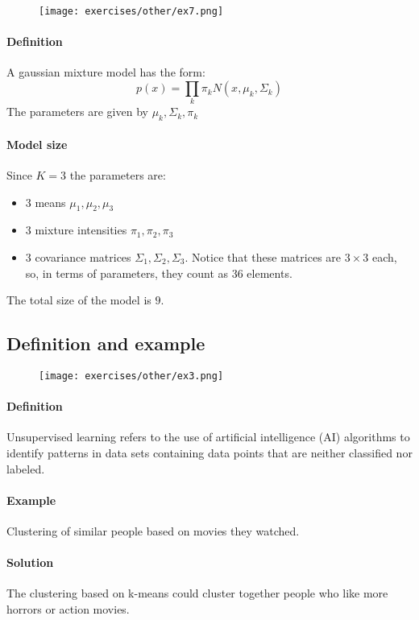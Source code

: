 \begin{figure}[H]
    \centering
    \texttt{[image: exercises/other/ex7.png]}
\end{figure}

\paragraph{Definition}
A gaussian mixture model has the form:
$$p(x)=\prod_k \pi_k N(x,\mu_k,\Sigma_k)$$
The parameters are given by $\mu_k, \Sigma_k, \pi_k$

\paragraph{Model size }
Since $K=3$ the parameters are: 
\begin{itemize}
\item 3 means $\mu_1,\mu_2,\mu_3$ 
\item 3 mixture intensities $\pi_1,\pi_2,\pi_3$ 
\item 3 covariance matrices $\Sigma_1,\Sigma_2,\Sigma_3$. Notice that these matrices are $3\times 3$ each, so, in terms of parameters, they count as $36$ elements.
\end{itemize}
The total size of the model is $9$.


\subsection{Definition and example}

\begin{figure}[H]
    \centering
    \texttt{[image: exercises/other/ex3.png]}
\end{figure}


\paragraph{Definition}
Unsupervised learning refers to the use of artificial intelligence (AI) algorithms to identify patterns in data sets containing data points that are neither classified nor labeled.

\paragraph{Example}
Clustering of similar people based on movies they watched.

\paragraph{Solution}
The clustering based on k-means could cluster together people who like more horrors or action movies.

